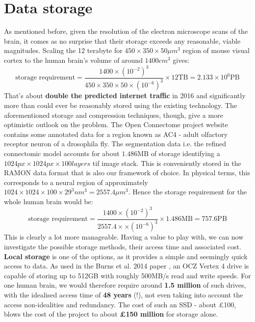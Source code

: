 \documentclass[a4paper, 11pt]{article}
\numberwithin{equation}{section}
\begin{document}
		\section{Data storage}
		\label{data_storage}
		As mentioned before, given the resolution of the electron microscope scans of the brain, it comes as no surprise that their storage exceeds any reasonable, viable magnitudes. Scaling the 12 terabyte for $450 \times 350 \times 50 \mu m^3$ region of mouse visual cortex \cite{kleissaslarge} to the human brain's volume of around $1400 cm^3$ gives:
		\begin{equation}
		\textrm{storage requirement} = \frac{1400 \times (10^{-2})^3}{450\times 350 \times 50 \times (10^{-6})^3} \times 12 \textrm{TB} = 2.133 \times 10^6 \textrm{PB}
		\end{equation}
		That's about \textbf{double the predicted internet traffic} in 2016 \cite{telegraph2016traffic} and significantly more than could ever be reasonably stored using the existing technology. The aforementioned storage and compression techniques, though, give a more optimistic outlook on the problem. The Open Connectome project website contains some annotated data for a region known as AC4 - adult olfactory receptor neuron of a drosophila fly. The segmentation data i.e. the refined connectomic model accounts for about $1.486 \textrm{MB}$ of storage identifying a $1024px\times1024px\times100layers$ tif image stack. This is conveniently stored in the RAMON data format that is also our framework of choice. In physical terms, this corresponds to a neural region of approximately $1024\times1024\times100\times29^3 nm^3=2557.4\mu m ^3$. Hence the storage requirement for the whole human brain would be:
		\begin{equation}
		\textrm{storage requirement} = \frac{1400 \times (10^{-2})^3}{2557.4\times  \times (10^{-6})^3} \times 1.486 \textrm{MB} = 757.6 \textrm{PB}
		\end{equation}
		This is clearly a lot more manageable. Having a value to play with, we can now investigate the possible storage methods, their access time and associated cost.\\
		
		\noindent \textbf{Local storage} is one of the options, as it provides a simple and seemingly quick access to data. As used in the Burns et al. 2014 paper \cite{burns2013open}, an OCZ Vertex 4 drive is capable of storing up to 512GB with roughly 500MB/s read and write speeds. For one human brain, we would therefore require around \textbf{1.5 million} of such drives, with the idealised access time of \textbf{48 years} (!), not even taking into account the access non-idealities and redundancy. The cost of such an SSD - about \pounds100, blows the cost of the project to about \textbf{\pounds150 million} for storage alone.\\
		
\end{document}
